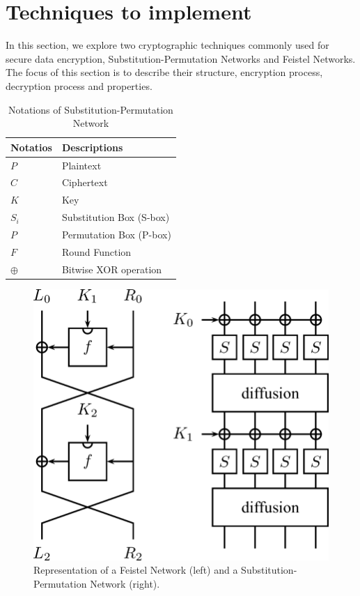 \documentclass[conference]{IEEEtran}
\begin{document}
\section{Techniques to implement} \label{tecnicas}
In this section, we explore two cryptographic techniques commonly used for secure data encryption, Substitution-Permutation Networks and Feistel Networks. The focus of this section is to describe their structure, encryption process, decryption process and properties.\cite{zhong2024lightweight}
\begin{table}[ht]
    \centering
    \caption{Notations of Substitution-Permutation Network}
    \begin{tabular}{ll}
        \toprule
        \textbf{Notatios} & \textbf{Descriptions} \\
        \midrule
        $P$ & Plaintext \\
        $C$ & Ciphertext \\
        $K$ & Key \\
        $S_i$ & Substitution Box (S-box) \\
        $P$ & Permutation Box (P-box) \\
        $F$ & Round Function \\
        $\oplus$ & Bitwise XOR operation \\
        \bottomrule
    \end{tabular}
    \label{table:spn}
\end{table}

\begin{figure}
    \centering
    \includegraphics[width=\columnwidth]{figures/FEISTEL-SPN.png}
    \caption{Representation of a Feistel Network (left) and a Substitution-Permutation Network (right).}
    \label{fig:FEISTEL-SPN}
\end{figure}
\end{document}
